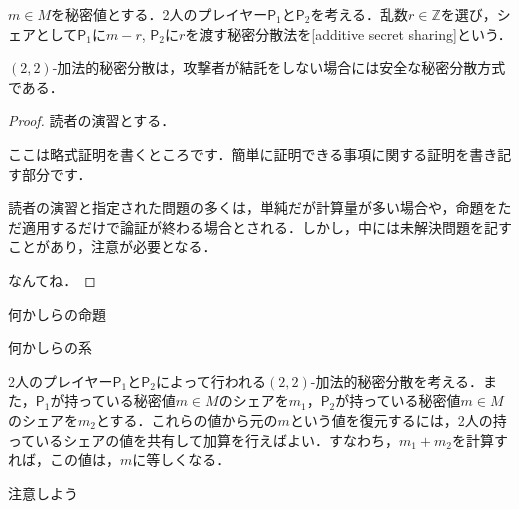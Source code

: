 \documentclass[uplatex]{jsreport}
\begin{document}
\sukima
\begin{defi}\label{def:additiveSS}
  $m \in M$を秘密値とする．2人のプレイヤー$\mathsf{P}_1$と$\mathsf{P}_2$を考える．乱数$r \in \mathbb{Z}$を選び，シェアとして$\mathsf{P}_1$に$m - r$, $\mathsf{P}_2$に$r$を渡す秘密分散法を[additive secret sharing]という．
\end{defi}
\begin{theo}
  $(2,2)$-加法的秘密分散は，攻撃者が結託をしない場合には安全な秘密分散方式である．
\end{theo}
\begin{proof}
  読者の演習とする．
  \begin{subproof}
    ここは略式証明を書くところです．簡単に証明できる事項に関する証明を書き記す部分です．\par
    読者の演習と指定された問題の多くは，単純だが計算量が多い場合や，命題をただ適用するだけで論証が終わる場合とされる．しかし，中には未解決問題を記すことがあり，注意が必要となる．
  \end{subproof}
  なんてね．
\end{proof}
\begin{prop}
  何かしらの命題
\end{prop}
\begin{cor}
  何かしらの系
\end{cor}
\begin{exam}
  2人のプレイヤー$\mathsf{P}_1$と$\mathsf{P}_2$によって行われる$(2,2)$-加法的秘密分散を考える．また，$\mathsf{P}_1$が持っている秘密値$m \in M$のシェアを$m_1$，$\mathsf{P}_2$が持っている秘密値$m \in M$のシェアを$m_2$とする．これらの値から元の$m$という値を復元するには，2人の持っているシェアの値を共有して加算を行えばよい．すなわち，$m_1 + m_2$を計算すれば，この値は，$m$に等しくなる．
\end{exam}
\begin{remark}
  注意しよう
\end{remark}
\par\sukima
\end{document}
